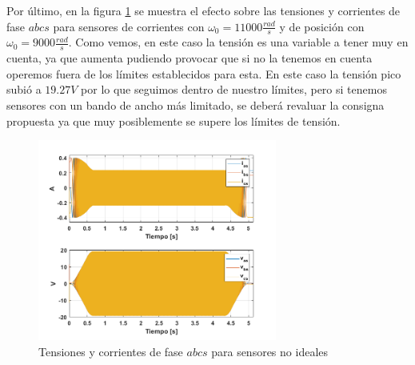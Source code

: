 \documentclass[10pt]{article}
\begin{document}
\begin{itemize}
Por último, en la figura \ref{fig:corrientesensores} se muestra el efecto sobre las tensiones y corrientes de fase $abcs$ para sensores de corrientes con $\omega_{0}=11000 \frac{rad}{s}$ y de posición con $\omega_{0}=9000 \frac{rad}{s}$. Como vemos, en este caso la tensión es una variable a tener muy en cuenta, ya que aumenta pudiendo provocar que si no la tenemos en cuenta operemos fuera de los límites establecidos para esta. En este caso la tensión pico subió a $19.27 V$ por lo que seguimos dentro de nuestro límites, pero si tenemos sensores con un bando de ancho más limitado, se deberá revaluar la consigna propuesta ya que muy posiblemente se supere los límites de tensión.
 \begin{figure}[h!]
	\centering
	\includegraphics[width=0.7\textwidth]{corrientesensores.png}
	\caption{\label{fig:corrientesensores}Tensiones y corrientes de fase $abcs$ para sensores no ideales}
	\end{figure}
\end{itemize}

\newpage
\end{document}
